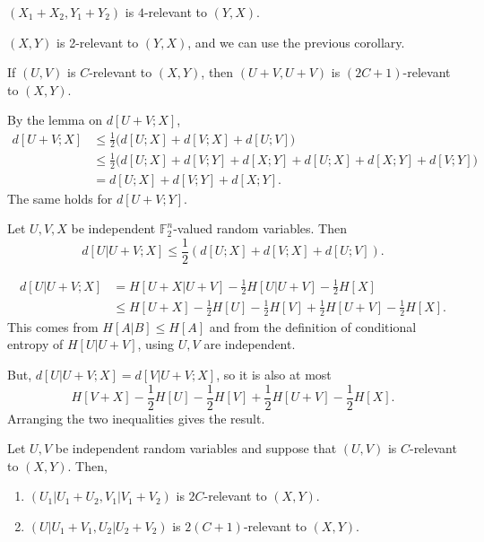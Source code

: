 \documentclass[12pt]{article}
\begin{document}
\begin{corollary}
	$(X_1 + X_2, Y_1 + Y_2)$ is $4$-relevant to $(Y, X)$.
\end{corollary}

\begin{proofbox}
	$(X, Y)$ is 2-relevant to $(Y, X)$, and we can use the previous corollary.
\end{proofbox}

\begin{corollary}
	If $(U, V)$ is $C$-relevant to $(X, Y)$, then $(U + V, U + V)$ is $(2C+1)$-relevant to $(X, Y)$.
\end{corollary}

\begin{proofbox}
	By the lemma on $d[U + V; X]$,
	\begin{align*}
		d[U + V; X] &\leq \frac 12 \biggl( d[U; X] + d[V; X] + d [U; V] \biggr) \\
			    &\leq \frac 12 \biggl( d[U; X] + d[V; Y] + d[X; Y] + d[U; X] + d[X; Y] + d[V; Y] \biggr) \\
			    &= d[U; X] + d[V; Y] + d[X; Y].
	\end{align*}
	The same holds for $d[U + V; Y]$.
\end{proofbox}


\begin{lemma}
	Let $U, V, X$ be independent $\mathbb{F}_2^{n}$-valued random variables. Then
	\[
		d[U|U+V; X] \leq \frac 12 \left( d[U; X] + d[V; X] + d[U; V] \right).
	\]
\end{lemma}

\begin{proofbox}
	\begin{align*}
		d[U|U+V;X] &= H[U+X|U+V] - \frac 12 H[U|U+V] - \frac 12 H[X] \\
			   &\leq H[U+X] - \frac 12 H[U] - \frac 12 H[V] + \frac 12 H[U + V] - \frac 12 H[X].
	\end{align*}
	This comes from $H[A|B] \leq H[A]$ and from the definition of conditional entropy of $H[U|U+V]$, using $U, V$ are independent.

	But, $d[U|U+V; X] = d[V|U+V;X]$, so it is also at most
	\[
		H[V + X] - \frac 12 H[U] - \frac 12 H[V] + \frac 12 H[U + V] - \frac 12 H[X].
	\]
	Arranging the two inequalities gives the result.
\end{proofbox}

\begin{corollary}
	Let $U, V$ be independent random variables and suppose that $(U, V)$ is $C$-relevant to $(X, Y)$. Then,
	\begin{enumerate}[\normalfont(i)]
		\item $(U_1|U_1+U_2, V_1|V_1+V_2)$ is $2C$-relevant to $(X, Y)$.
		\item $(U|U_1+V_1, U_2|U_2+V_2)$ is $2(C+1)$-relevant to $(X, Y)$.
	\end{enumerate}
\end{corollary}
\end{document}
